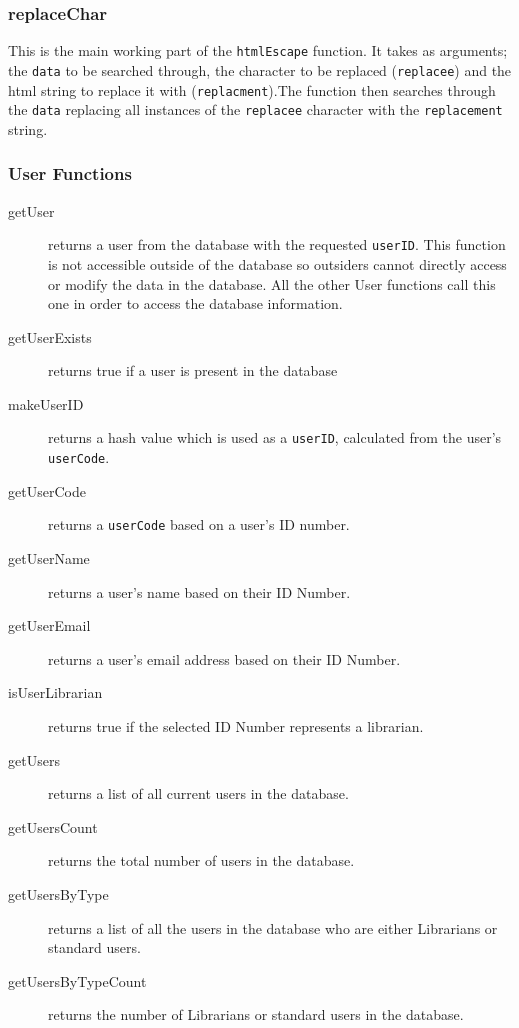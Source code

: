 \documentclass{article}
\begin{document}
\subsubsection*{replaceChar}
This is the main working part of the \verb|htmlEscape| function. It takes as arguments; the \verb|data| to be searched through, the character to be replaced (\verb|replacee|) and the html string to replace it with (\verb|replacment|).The function then searches through the \verb|data| replacing all instances of the \verb|replacee| character with the \verb|replacement| string.

\subsubsection{User Functions}
\begin{description}
\item[getUser] returns a user from the database with the requested \verb|userID|. This function is not accessible outside of the database so outsiders cannot directly access or modify the data in the database. All the other User functions call this one in order to access the database information.
\item[getUserExists] returns true if a user is present in the database
\item[makeUserID] returns a hash value which is used as a \verb|userID|, calculated from the user's \verb|userCode|.
\item[getUserCode] returns a \verb|userCode| based on a user's ID number.
\item[getUserName] returns a user's name based on their ID Number.
\item[getUserEmail] returns a user's email address based on their ID Number.
\item[isUserLibrarian] returns true if the selected ID Number represents a librarian.
\item[getUsers] returns a list of all current users in the database.
\item[getUsersCount] returns the total number of users in the database.
\item[getUsersByType] returns a list of all the users in the database who are either Librarians or standard users.
\item[getUsersByTypeCount] returns the number of Librarians or standard users in the database.
\end{description}
\end{document}
